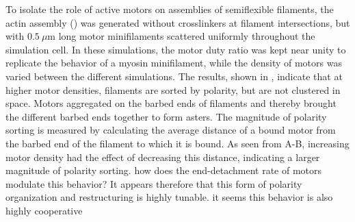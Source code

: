 \documentclass[11pt]{article}
\begin{document}
To isolate the role of active motors on assemblies of semiflexible filaments, the actin assembly () was generated without  
crosslinkers at filament intersections, but with $0.5\ \mu$m {\color{red}long} motor minifilaments scattered uniformly throughout the simulation cell. 
In these simulations, the motor duty ratio was kept near unity to replicate the behavior of a myosin minifilament, 
while the density of motors was varied between {\color{red}the different} simulations. The results, shown in , indicate that at higher motor densities, filaments are sorted by polarity, but are
not clustered {\color{red}in space}. Motors aggregated on the barbed ends of filaments
and thereby brought the {\color{red}different} barbed ends together to form asters. The magnitude of polarity sorting is measured
by calculating the average distance of a bound motor from the barbed end of the filament to which it is bound. As seen from 
 A-B, increasing motor density had the effect of decreasing this distance, indicating a larger
magnitude of polarity sorting. {\color{blue}how does the end-detachment rate of motors modulate this behavior?} It appears therefore that this form of {\color{red}polarity organization} and restructuring is highly tunable. {\color{blue}it seems this behavior is also highly cooperative}
\end{document}
